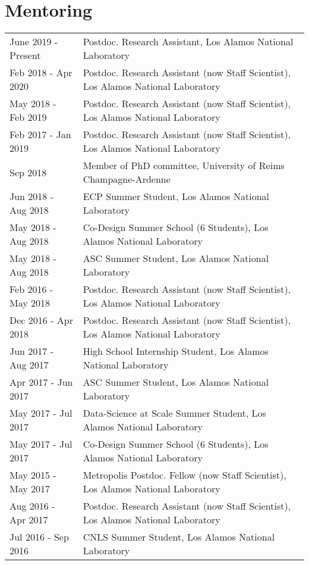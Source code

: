 \documentclass{article}
\begin{document}
\vspace{-2mm}
\section*{Mentoring}
\vspace{-4mm}

\begin{longtable}{p{}p{}}
June 2019 - Present & Postdoc. Research Assistant, Los Alamos National Laboratory \\
Feb 2018 - Apr 2020 & Postdoc. Research Assistant (now Staff Scientist), Los Alamos National Laboratory \\
May 2018 - Feb 2019 & Postdoc. Research Assistant (now Staff Scientist), Los Alamos National Laboratory \\
Feb 2017 - Jan 2019 & Postdoc. Research Assistant (now Staff Scientist), Los Alamos National Laboratory \\
Sep 2018 & Member of PhD committee, University of Reims Champagne-Ardenne \\
Jun 2018 - Aug 2018 & ECP Summer Student, Los Alamos National Laboratory \\
May 2018 - Aug 2018 & Co-Design Summer School (6 Students), Los Alamos National Laboratory \\
May 2018 - Aug 2018 & ASC Summer Student, Los Alamos National Laboratory \\
Feb 2016 - May 2018 & Postdoc. Research Assistant (now Staff Scientist), Los Alamos National Laboratory \\
Dec 2016 - Apr 2018 & Postdoc. Research Assistant (now Staff Scientist), Los Alamos National Laboratory \\
Jun 2017 - Aug 2017 & High School Internship Student, Los Alamos National Laboratory \\
Apr 2017 - Jun 2017 & ASC Summer Student, Los Alamos National Laboratory \\
May 2017 - Jul 2017 & Data-Science at Scale Summer Student, Los Alamos National Laboratory \\
May 2017 - Jul 2017 & Co-Design Summer School (6 Students), Los Alamos National Laboratory \\
May 2015 - May 2017 & Metropolis Postdoc. Fellow (now Staff Scientist), Los Alamos National Laboratory \\
Aug 2016 - Apr 2017 & Postdoc. Research Assistant (now Staff Scientist), Los Alamos National Laboratory \\
Jul 2016 - Sep 2016 & CNLS Summer Student, Los Alamos National Laboratory \\

\end{longtable}
\end{document}
